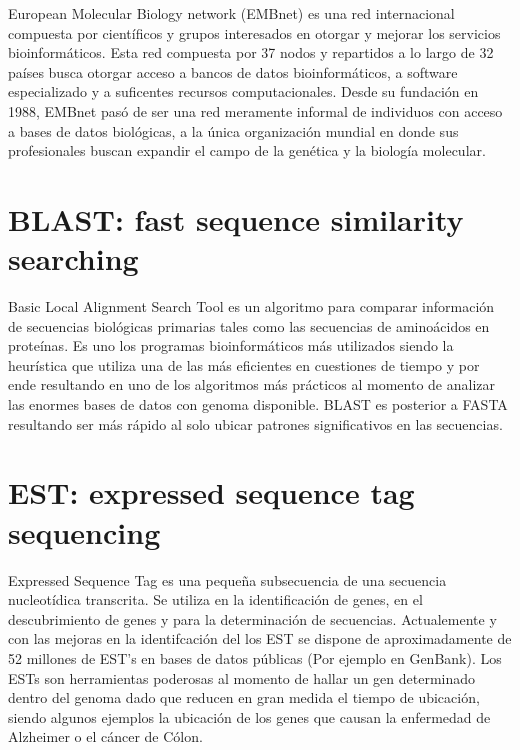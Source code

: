 \documentclass[12pt,conference]{IEEEtran}
\begin{document}
European Molecular Biology network (EMBnet) es una red internacional compuesta por científicos y grupos interesados en otorgar y mejorar los servicios bioinformáticos. Esta red  compuesta por 37  nodos y repartidos a lo largo de 32 países busca otorgar acceso a bancos de datos bioinformáticos, a software especializado y a suficentes recursos computacionales. Desde su fundación en 1988, EMBnet pasó de ser una red meramente informal  de individuos con acceso a bases de datos biológicas, a la única organización mundial en donde sus profesionales buscan expandir el campo de la genética y la biología molecular. \citep{d200920}


\medskip


\section{BLAST: fast sequence similarity searching}

Basic Local Alignment Search Tool es un algoritmo para comparar información de secuencias  biológicas primarias tales como las secuencias de aminoácidos en proteínas. Es uno los programas bioinformáticos más utilizados siendo la heurística que utiliza una de las más eficientes en cuestiones de tiempo y por ende resultando en uno de los algoritmos más prácticos al momento de analizar las enormes bases de datos con genoma disponible. BLAST es posterior a FASTA resultando ser más rápido al solo ubicar patrones significativos en las secuencias.  \citep{altschul1990basic}

\medskip

\section{EST: expressed sequence tag sequencing}

Expressed Sequence Tag es una pequeña subsecuencia de una secuencia nucleotídica transcrita. Se utiliza en la identificación de genes, en el descubrimiento de genes y para la determinación de secuencias. Actualemente y con las mejoras en la identifcación del los EST se dispone de aproximadamente de 52 millones de EST's en bases de datos públicas (Por ejemplo en GenBank). Los ESTs son herramientas poderosas al momento de hallar un gen determinado dentro del genoma dado que reducen en gran medida el tiempo de ubicación, siendo algunos ejemplos la ubicación de los genes que causan la enfermedad de Alzheimer o el cáncer de Cólon. \citep{adams1991complementary} \citep{wiki_1}

\medskip


 
\end{document}
